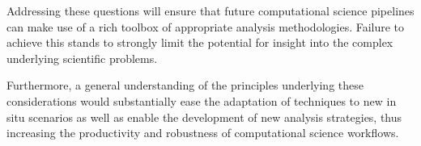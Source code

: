 \begin{refsection}
 Addressing these questions will ensure that future computational science pipelines can make use of a rich toolbox of appropriate analysis methodologies. Failure to achieve this stands to strongly limit the potential for insight into the complex underlying scientific problems.

Furthermore, a general understanding of the principles underlying these considerations would substantially ease the adaptation of techniques to new in situ scenarios as well as enable the development of new analysis strategies, thus increasing the productivity and robustness of computational science workflows.

\printbibliography
\end{refsection}





